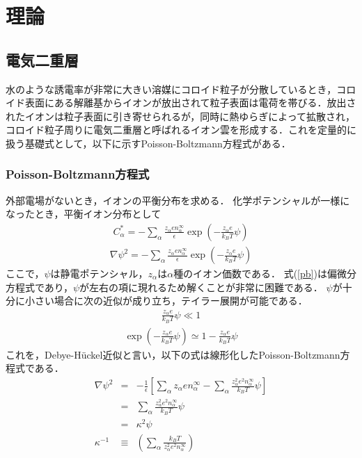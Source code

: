 \section{\large 理論}
\subsection{電気二重層}
\par 水のような誘電率が非常に大きい溶媒にコロイド粒子が分散しているとき，コロイド表面にある解離基からイオンが放出されて粒子表面は電荷を帯びる．放出されたイオンは粒子表面に引き寄せられるが，同時に熱ゆらぎによって拡散され，コロイド粒子周りに電気二重層と呼ばれるイオン雲を形成する．これを定量的に扱う基礎式として，以下に示すPoisson-Boltzmann方程式がある．
\subsubsection{Poisson-Boltzmann方程式}
%
外部電場がないとき，イオンの平衡分布を求める．
化学ポテンシャルが一様になったとき，平衡イオン分布として
\begin{eqnarray}
C^*_{\alpha} = -\sum_\alpha\frac{z_\alpha en_\alpha ^\infty}{\epsilon}\exp(-\frac{z_\alpha e}{k_B T}\psi)
\label{pb}
\end{eqnarray}
\begin{eqnarray}
\nabla\psi ^2 = -\sum_\alpha\frac{z_\alpha en_\alpha ^\infty}{\epsilon}\exp(-\frac{z_\alpha e}{k_B T}\psi)
\label{pb}
\end{eqnarray}
%
ここで，$\psi$は静電ポテンシャル，$z_\alpha$は$\alpha$種のイオン価数である．
%
式(\ref{pb})は偏微分方程式であり，$\psi$が左右の項に現れるため解くことが非常に困難である．
%
$\psi$が十分に小さい場合に次の近似が成り立ち，テイラー展開が可能である．
\begin{eqnarray}
\frac{z_\alpha e}{k_B T}\psi \ll 1
\label{dh}
\end{eqnarray}
%
\begin{eqnarray}
\exp (-\frac{z_\alpha e}{k_B T}\psi)\simeq 1-\frac{z_\alpha e}{k_B T}\psi
\label{taylor}
\end{eqnarray}
%
これを，Debye-H\"uckel近似と言い，以下の式は線形化したPoisson-Boltzmann方程式である．
%
\begin{eqnarray}
\nabla\psi ^2 &=& -\frac{1}{\epsilon}[\sum_\alpha z_\alpha en_\alpha ^\infty - \sum_\alpha\frac{z_\alpha ^2 e^2 n_\alpha ^\infty}{k_B T}\psi]\\
\label{lpb1}
&=&\sum_\alpha\frac{z_\alpha ^2 e^2 n_\alpha ^\infty}{k_B T}\psi\\
\label{lpb2}
&=&\kappa ^2 \psi \\
\label{lpb3}
\kappa ^{-1} &\equiv& (\sum_\alpha\frac{k_B T}{z_\alpha ^2 e^2 n_\alpha ^\infty})
\label{debye l}
\end{eqnarray}
